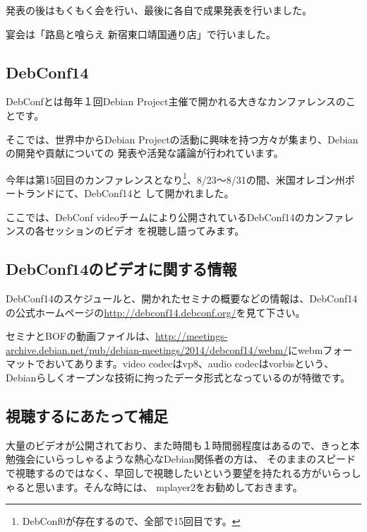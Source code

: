 \documentclass[mingoth,a4paper]{jsarticle}
\begin{document}
 発表の後はもくもく会を行い、最後に各自で成果発表を行いました。

 宴会は「路島と喰らえ 新宿東口靖国通り店」で行いました。



\subsection{DebConf14}

 DebConfとは毎年１回Debian Project主催で開かれる大きなカンファレンスのことです。

 そこでは、世界中からDebian Projectの活動に興味を持つ方々が集まり、Debianの開発や貢献についての
発表や活発な議論が行われています。

 今年は第15回目のカンファレンスとなり\footnote{DebConf0が存在するので、全部で15回目です。}、8/23〜8/31の間、米国オレゴン州ポートランドにて、DebConf14と
して開かれました。

 ここでは、DebConf videoチームにより公開されているDebConf14のカンファレンスの各セッションのビデオ
を視聴し語ってみます。

\subsection{DebConf14のビデオに関する情報}

 DebConf14のスケジュールと、開かれたセミナの概要などの情報は、DebConf14の公式ホームページの\url{http://debconf14.debconf.org/}を見て下さい。

 セミナとBOFの動画ファイルは、\url{http://meetings-archive.debian.net/pub/debian-meetings/2014/debconf14/webm/}にwebmフォーマットでおいてあります。video codecはvp8、audio codecはvorbisという、Debianらしくオープンな技術に拘ったデータ形式となっているのが特徴です。

\subsection{視聴するにあたって補足}

 大量のビデオが公開されており、また時間も１時間弱程度はあるので、きっと本勉強会にいらっしゃるような熱心なDebian関係者の方は、
そのままのスピードで視聴するのではなく、早回しで視聴したいという要望を持たれる方がいらっしゃると思います。そんな時には、
mplayer2をお勧めしておきます。
\end{document}
